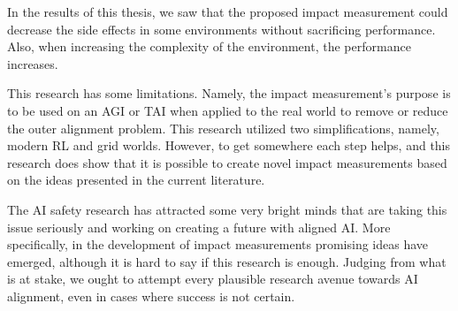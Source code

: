 \documentclass[12pt,A4]{report}
\theoremstyle{definition}
\begin{document}


In the results of this thesis, we saw that the proposed impact measurement could decrease the side effects in some environments without sacrificing performance. Also, when increasing the complexity of the environment, the performance increases.  

This research has some limitations. Namely, the impact measurement's purpose is to be used on an AGI or TAI when applied to the real world to remove or reduce the outer alignment problem. This research utilized two simplifications, namely, modern RL and grid worlds. However, to get somewhere each step helps, and this research does show that it is possible to create novel impact measurements based on the ideas presented in the current literature.

The AI safety research has attracted some very bright minds that are taking this issue seriously and working on creating a future with aligned AI. More specifically, in the development of impact measurements promising ideas have emerged, although it is hard to say if this research is enough. Judging from what is at stake, we ought to attempt every plausible research avenue towards AI alignment, even in cases where success is not certain.


\end{document}
